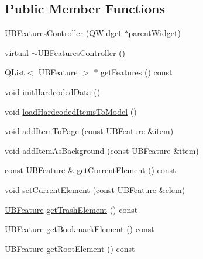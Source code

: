 \subsection*{Public Member Functions}
\begin{DoxyCompactItemize}
\item 
\hyperlink{class_u_b_features_controller_ad7cbd54520c41aad81eec981e4a3132e}{U\-B\-Features\-Controller} (Q\-Widget $\ast$parent\-Widget)
\item 
virtual \hyperlink{class_u_b_features_controller_a32d8a7f4ab318ee141639a2e54d198e3}{$\sim$\-U\-B\-Features\-Controller} ()
\item 
Q\-List$<$ \hyperlink{class_u_b_feature}{U\-B\-Feature} $>$ $\ast$ \hyperlink{class_u_b_features_controller_a5fc8ba7d2cf4c8e18bf99dff9b6d0dd6}{get\-Features} () const 
\item 
void \hyperlink{class_u_b_features_controller_a2b4de09d84eb26fdd0cceee62f412865}{init\-Hardcoded\-Data} ()
\item 
void \hyperlink{class_u_b_features_controller_a20e01d353932b4077c5c57deea2e7a64}{load\-Hardcoded\-Items\-To\-Model} ()
\item 
void \hyperlink{class_u_b_features_controller_a38042ae37804ee19bfacf4aafd096ea9}{add\-Item\-To\-Page} (const \hyperlink{class_u_b_feature}{U\-B\-Feature} \&item)
\item 
void \hyperlink{class_u_b_features_controller_a0ecd4b84e703063db5c0fdf498f2cdb0}{add\-Item\-As\-Background} (const \hyperlink{class_u_b_feature}{U\-B\-Feature} \&item)
\item 
const \hyperlink{class_u_b_feature}{U\-B\-Feature} \& \hyperlink{class_u_b_features_controller_a15d83c0c4e01b2b0fd063bc550adf1ff}{get\-Current\-Element} () const 
\item 
void \hyperlink{class_u_b_features_controller_a88dfa57014eceb1712c1137947ebe71d}{set\-Current\-Element} (const \hyperlink{class_u_b_feature}{U\-B\-Feature} \&elem)
\item 
\hyperlink{class_u_b_feature}{U\-B\-Feature} \hyperlink{class_u_b_features_controller_a6aaa4c08bbbc9065ba3f76e8e1053cee}{get\-Trash\-Element} () const 
\item 
\hyperlink{class_u_b_feature}{U\-B\-Feature} \hyperlink{class_u_b_features_controller_abb0390432dc2882dbed454e9ee748561}{get\-Bookmark\-Element} () const 
\item 
\hyperlink{class_u_b_feature}{U\-B\-Feature} \hyperlink{class_u_b_features_controller_a0a9c0304c92a91b82776b1df2c7965f8}{get\-Root\-Element} () const 
\item 

\end{DoxyCompactItemize}
